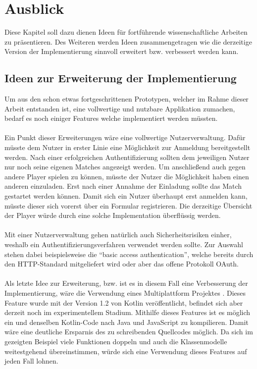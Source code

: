 
\chapter{Ausblick}
Diese Kapitel soll dazu dienen Ideen für fortführende wissenschaftliche Arbeiten zu präsentieren. Des Weiteren werden Ideen zusammengetragen wie die derzeitige Version der Implementierung sinnvoll erweitert bzw. verbessert werden kann.

\section{Ideen zur Erweiterung der Implementierung}
Um aus den schon etwas fortgeschrittenen Prototypen, welcher im Rahme dieser Arbeit entstanden ist, eine vollwertige und nutzbare Applikation zumachen, bedarf es noch einiger Features welche implementiert werden müssten.\\
\\
Ein Punkt dieser Erweiterungen wäre eine vollwertige Nutzerverwaltung. Dafür müsste dem Nutzer in erster Linie eine Möglichkeit zur Anmeldung bereitgestellt werden. Nach einer erfolgreichen Authentifizierung sollten dem jeweiligen Nutzer nur noch seine eigenen Matches angezeigt werden.
Um anschließend auch gegen andere Player spielen zu können, müsste der Nutzer die Möglichkeit haben einen anderen einzuladen. Erst nach einer Annahme der Einladung sollte das Match gestartet werden können. Damit sich ein Nutzer überhaupt erst anmelden kann, müsste dieser sich vorerst über ein Formular registrieren. Die derzeitige Übersicht der Player würde durch eine solche Implementation überflüssig werden.\\
\\
Mit einer Nutzerverwaltung gehen natürlich auch Sicherheitsrisiken einher, weshalb ein Authentifizierungsverfahren verwendet werden sollte. Zur Auswahl stehen dabei beispielsweise die \enquote{basic access authentication}, welche bereits durch den \gls{HTTP}-Standard mitgeliefert wird oder aber das offene Protokoll \gls{OAuth}.\\
\\
Als letzte Idee zur Erweiterung, bzw. ist es in diesem Fall eine Verbesserung der Implementierung, wäre die Verwendung eines Multiplattform Projektes \cite{kotlinMultiPlattform}. Dieses Feature wurde mit der Version 1.2 von Kotlin veröffentlicht, befindet sich aber derzeit noch im experimentellem Stadium. Mithilfe dieses Features ist es möglich ein und denselben Kotlin-Code nach Java und JavaScript zu kompilieren. Damit wäre eine deutliche Ersparnis des zu schreibenden Quellcodes möglich. Da sich im gezeigten Beispiel viele Funktionen doppeln und auch die Klassenmodelle weitestgehend übereinstimmen, würde sich eine Verwendung dieses Features auf jeden Fall lohnen.

